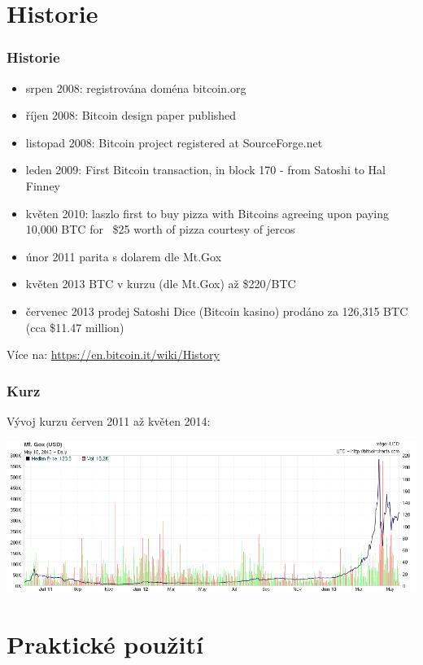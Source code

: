 \documentclass[xetex]{beamer}
\begin{document}
\section{Historie}

\begin{frame}
  \frametitle{Historie}
        \begin{itemize}
                \item srpen 2008: registrována doména bitcoin.org
                \item říjen 2008: Bitcoin design paper published
                \item listopad 2008: Bitcoin project registered at SourceForge.net
                \item leden 2009: First Bitcoin transaction, in block 170 - from Satoshi to Hal Finney
                \item květen 2010: laszlo first to buy pizza with Bitcoins agreeing upon paying 10,000 BTC for ~\$25 worth of pizza courtesy of jercos
		\item únor 2011 parita s dolarem dle Mt.Gox
		\item květen 2013 BTC v kurzu (dle Mt.Gox) až \$220/BTC
		\item červenec 2013 prodej Satoshi Dice (Bitcoin kasino) prodáno za 126,315 BTC (cca \$11.47 million)
	\end{itemize}

        Více na: \url{https://en.bitcoin.it/wiki/History}
\end{frame}

\begin{frame}
        \frametitle{Kurz}
        Vývoj kurzu červen 2011 až květen 2014:

        \includegraphics[scale=0.35]{images/bitcoin-exchange-rate.png}
\end{frame}


\section{Praktické použití}
\end{document}
